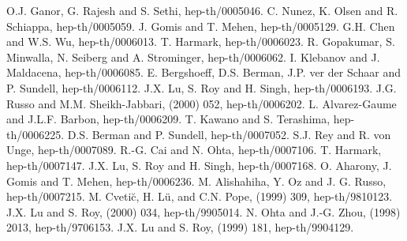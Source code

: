 \documentclass[a4paper,12pt]{article}
\begin{document}
\begin{thebibliography}{99}
 O.J. Ganor, G. Rajesh and S. Sethi, hep-th/0005046.
 C. Nunez, K. Olsen and R. Schiappa, hep-th/0005059.
 J. Gomis and T. Mehen, hep-th/0005129.
 G.H. Chen and W.S. Wu, hep-th/0006013.
 T. Harmark, hep-th/0006023.
 R. Gopakumar, S. Minwalla, N. Seiberg and A. Strominger,
 hep-th/0006062.
 I. Klebanov and J. Maldacena, hep-th/0006085.
 E. Bergshoeff, D.S. Berman, J.P. ver der Schaar and P.
 Sundell, hep-th/0006112.
 J.X. Lu, S. Roy and H. Singh, hep-th/0006193.
 J.G. Russo and M.M. Sheikh-Jabbari,  (2000) 052,
 hep-th/0006202.
 L. Alvarez-Gaume and J.L.F. Barbon, hep-th/0006209.
 T. Kawano and S. Terashima, hep-th/0006225.
 D.S. Berman and P. Sundell, hep-th/0007052.
 S.J. Rey and R. von Unge, hep-th/0007089.
 R.-G. Cai and N. Ohta, hep-th/0007106.
 T. Harmark, hep-th/0007147.
 J.X. Lu, S. Roy and H. Singh, hep-th/0007168.
 O. Aharony, J. Gomis and T. Mehen, hep-th/0006236.
 M. Alishahiha, Y. Oz and J. G. Russo, hep-th/0007215.
 M. Cveti\u{c}, H. L\"{u}, and C.N. Pope, 
 (1999) 309, hep-th/9810123.
 J.X. Lu and S. Roy,  (2000) 034, hep-th/9905014.
 N. Ohta and J.-G. Zhou,  (1998) 2013, hep-th/9706153.
 J.X. Lu and S. Roy,  (1999) 181, hep-th/9904129.
\end{thebibliography}
\end{document}
